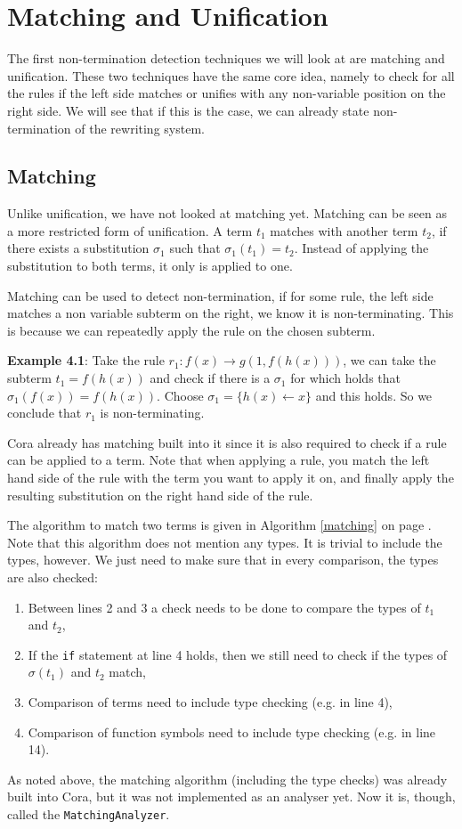 \chapter{Matching and Unification}\label{matching-unification}
The first non-termination detection techniques we will look at are matching and unification. These two techniques have the same core idea, namely to check for all the rules if the left side matches or unifies with any non-variable position on the right side. We will see that if this is the case, we can already state non-termination of the rewriting system.

\section{Matching}
Unlike unification, we have not looked at matching yet. Matching can be seen as a more restricted form of unification. A term $t_1$ matches with another term $t_2$, if there exists a substitution $\sigma_1$ such that $\sigma_1(t_1) = t_2$. Instead of applying the substitution to both terms, it only is applied to one.

Matching can be used to detect non-termination, if for some rule, the left side matches a non variable subterm on the right, we know it is non-terminating. This is because we can repeatedly apply the rule on the chosen subterm.

\textbf{Example 4.1}: Take the rule $r_1: f(x) \rightarrow g(1, f(h(x)))$, we can take the subterm $t_1 = f(h(x))$ and check if there is a $\sigma_1$ for which holds that $\sigma_1(f(x)) = f(h(x))$. Choose $\sigma_1 = \{ h(x) \leftarrow x \}$ and this holds. So we conclude that $r_1$ is non-terminating. 

Cora already has matching built into it since it is also required to check if a rule can be applied to a term. Note that when applying a rule, you match the left hand side of the rule with the term you want to apply it on, and finally apply the resulting substitution on the right hand side of the rule.

The algorithm to match two terms is given in Algorithm \ref{matching} on page \pageref{matching}. Note that this algorithm does not mention any types. It is trivial to include the types, however. We just need to make sure that in every comparison, the types are also checked:
\begin{enumerate}
    \itemsep0em
    \item Between lines 2 and 3 a check needs to be done to compare the types of $t_1$ and $t_2$,
    \item If the \texttt{if} statement at line 4 holds, then we still need to check if the types of $\sigma(t_1)$ and $t_2$ match,
    \item Comparison of terms need to include type checking (e.g. in line 4),
    \item Comparison of function symbols need to include type checking (e.g. in line 14).
\end{enumerate}
As noted above, the matching algorithm (including the type checks) was already built into Cora, but it was not implemented as an analyser yet. Now it is, though, called the \texttt{MatchingAnalyzer}. 

